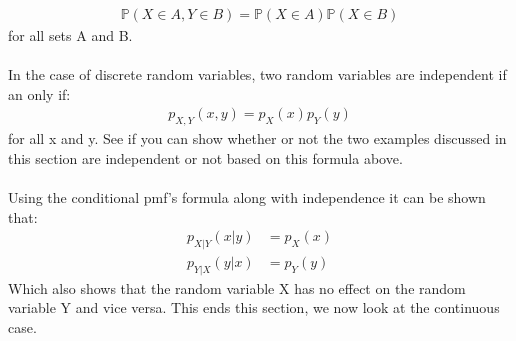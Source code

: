 \documentclass[,oneside]{article}
\begin{document}
\begin{enumerate}
\begin{align*}
\mathbb{P}(X \in A, Y \in B) = \mathbb{P}(X \in A)\mathbb{P}(X \in B)
\end{align*}
for all sets A and B.\\ \\
In the case of discrete random variables, two random variables are independent if an only if:
\begin{align*}
p_{X,Y}(x,y) = p_X(x)p_Y(y)
\end{align*}
for all x and y. See if you can show whether or not the two examples discussed in this section are independent or not based on this formula above.\\ \\
Using the conditional pmf's formula along with independence it can be shown that:
\begin{align*}
p_{X|Y}(x|y)&=p_X(x)\\
p_{Y|X}(y|x)&=p_Y(y)
\end{align*}
Which also shows that the random variable X has no effect on the random variable Y and vice versa. This ends this section, we now look at the continuous case.\\ 

\end{enumerate}
\end{document}
